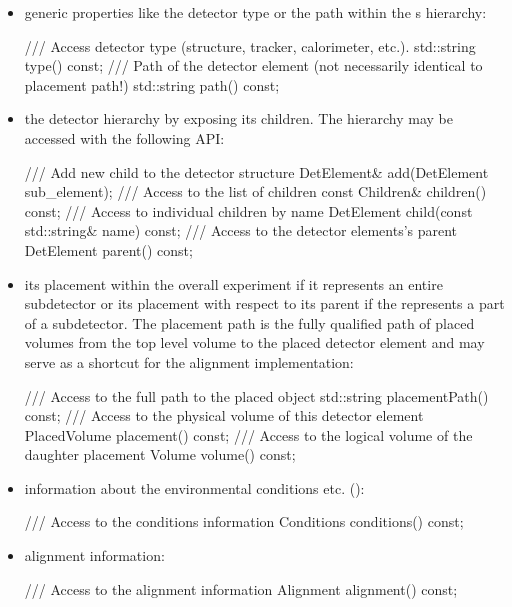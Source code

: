 \documentclass[10pt,a4paper]{article}
\begin{document}
\begin{itemize}\itemcompact
\item generic properties like the detector type or the path within the s
    hierarchy:
\begin{code}
  /// Access detector type (structure, tracker, calorimeter, etc.).
  std::string type() const;
  /// Path of the detector element (not necessarily identical to placement path!)
  std::string path() const;
\end{code}

\item the detector hierarchy by exposing its children. The hierarchy may be 
    accessed with the following API:
\begin{code}
  /// Add new child to the detector structure
  DetElement& add(DetElement sub_element);
  /// Access to the list of children
  const Children& children() const;
  /// Access to individual children by name
  DetElement child(const std::string& name) const;
  /// Access to the detector elements's parent
  DetElement parent() const;
\end{code}

\item its placement within the overall experiment if it represents an 
    entire subdetector or its placement with respect to its parent
    if the  represents a part of a subdetector.
    The placement path is the fully qualified path of placed volumes 
    from the top level volume to the placed detector element and may
    serve as a shortcut for the alignment implementation:
\begin{code}
  /// Access to the full path to the placed object
  std::string placementPath() const;
  /// Access to the physical volume of this detector element
  PlacedVolume placement() const;
  /// Access to the logical volume of the daughter placement
  Volume volume() const;
\end{code}

\item information about the environmental conditions etc. ():
\begin{code}
  /// Access to the conditions information 
  Conditions conditions() const;
\end{code}

\item alignment information:
\begin{code}
  /// Access to the alignment information
  Alignment alignment() const;
\end{code}


\end{itemize}
\end{document}
